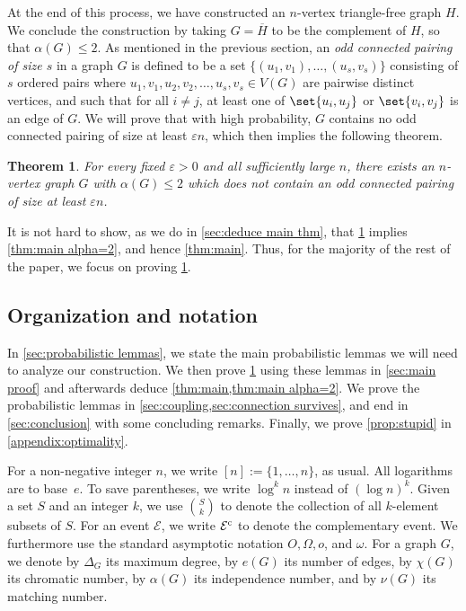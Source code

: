 \documentclass[11pt,reqno,oneside]{amsart}
\newtheorem{theorem}{Theorem}[section]
\theoremstyle{definition}
\newcommand\margindef[1]{\marginpar{\textcolor{gray!70!black}{\scriptsize #1}}}
\newcommand\1{\mathbf{1}}
\newcommand{\comp}{\textup{c}}
\newcommand{\eps}{\varepsilon}
\let\leq\leqslant
\begin{document}
At the end of this process, we have constructed an $n$-vertex triangle-free graph $H$. We conclude the construction by taking $G=\overline H$ to be the complement of $H$, so that $\alpha(G)\leq 2$. As mentioned in the previous section, an \emph{odd connected pairing of size $s$}\margindef{odd con-\\nected pairing} in a graph $G$ is defined to be a set $\{(u_1,v_1),\ldots,(u_s,v_s)\}$ consisting of $s$ ordered pairs where $u_1,v_1,u_2,v_2,\dots,u_s,v_s \in V(G)$ are pairwise distinct vertices, and such that for all $i \neq j$, at least one of $\set{u_i, u_j}$ or $\set{v_i, v_j}$ is an edge of $G$. We will prove that with high probability, $G$ contains no odd connected pairing of size at least $\varepsilon n$, which then implies the following theorem. 

\begin{theorem}\label{thm:odd pairing}
	For every fixed $\eps>0$ and all sufficiently large $n$, there exists an $n$-vertex graph $G$ with $\alpha(G)\leq 2$ which does not contain an odd connected pairing of size at least $\eps n$. 
\end{theorem}
It is not hard to show, as we do in \cref{sec:deduce main thm}, that \cref{thm:odd pairing} implies \cref{thm:main alpha=2}, and hence \cref{thm:main}. Thus, for the majority of the rest of the paper, we focus on proving \cref{thm:odd pairing}.

\subsection*{Organization and notation}
In \cref{sec:probabilistic lemmas}, we state the main probabilistic lemmas we will need to analyze our construction. We then prove \cref{thm:odd pairing} using these lemmas in \cref{sec:main proof} and afterwards deduce \cref{thm:main,thm:main alpha=2}. We prove the probabilistic lemmas in \cref{sec:coupling,sec:connection survives}, and end in \cref{sec:conclusion} with some concluding remarks. Finally, we prove \cref{prop:stupid} in \cref{appendix:optimality}.

For a non-negative integer $n$, we write $[n]:=\{1,\dots,n\}$, as usual. All logarithms are to base~$e$. To save parentheses, we write $\log^k n$ instead of $(\log n)^k$. Given a set $S$ and an integer $k$, we use $\binom Sk$ to denote the collection of all $k$-element subsets of $S$. For an event $\mathcal{E}$, we write $\mathcal{E}^\comp$ to denote the complementary event. We furthermore use the standard asymptotic notation $O,\Omega,o$, and $\omega$. For a graph $G$, we denote by $\Delta_G$ its maximum degree, by $e(G)$ its number of edges, by $\chi(G)$ its chromatic number, by $\alpha(G)$ its independence number, and by $\nu(G)$ its matching number.
\end{document}
